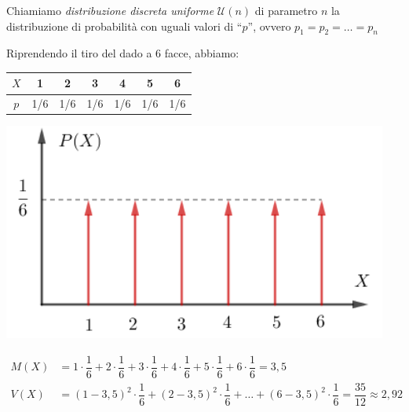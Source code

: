 \begin{definizione} Chiamiamo \emph{distribuzione discreta uniforme} \(\mathcal{U}(n)\) di parametro \(n\) la distribuzione di probabilità con uguali valori di ``\(p\)'', ovvero \(p_1=p_2=\dots=p_n\)
\end{definizione}
\begin{esempio} Riprendendo il tiro del dado a 6 facce, abbiamo:\\[4pt]
\begin{minipage}[c]{.6\textwidth}
\begin{center}
 \renewcommand\arraystretch{1.4}
\setlength\arraycolsep{22pt}
\begin{tabular}{c|c|c|c|c|c|c}
\(X\) & 1 & 2 & 3 & 4& 5 &6\\
\hline
\(p\) &1/6 & 1/6 &1/6 & 1/6 &1/6 & 1/6 \\
\end{tabular}
\end{center}

\end{minipage}
\begin{minipage}[c]{.4\textwidth}
\begin{center}
  \includegraphics[width=0.95\textwidth]{img/Uniforme_discr.png}
\end{center}
\end{minipage}
\[ \begin{split} M(X) &= 1 \cdot \dfrac{1}{6}+2 \cdot \dfrac{1}{6}+3 \cdot \dfrac{1}{6}+4 \cdot \dfrac{1}{6}+5 \cdot \dfrac{1}{6}+6 \cdot \dfrac{1}{6} = 3,5\\
V(X) &= (1-3,5)^2 \cdot \dfrac{1}{6}+(2-3,5)^2 \cdot \dfrac{1}{6}+\dots+(6-3,5)^2 \cdot \dfrac{1}{6} = \dfrac{35}{12} \approx 2,92  \end{split}\]


\end{esempio}
